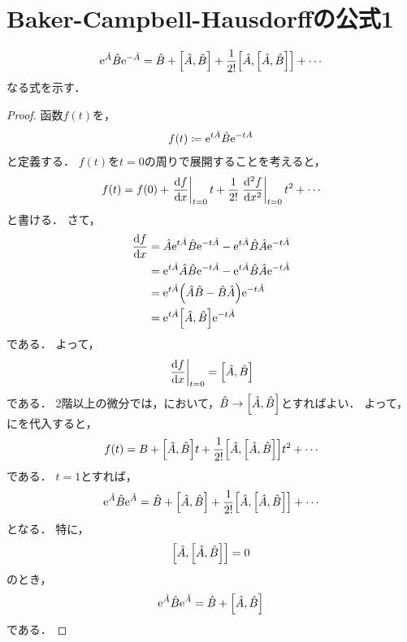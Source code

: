\documentclass{report}
\begin{document}
  \section{Baker-Campbell-Hausdorffの公式1}
    \begin{align}
      \mathrm{e}^{\hat{A}}\hat{B}\mathrm{e}^{-\hat{A}} = \hat{B} + \qty[\hat{A}, \hat{B}] + \frac{1}{2!}\qty[\hat{A}, \qty[\hat{A}, \hat{B}]] + \cdots
    \end{align}
    なる式を示す．
    \begin{proof}
      函数$f(t)$を，
      \begin{align}
        f(t) \coloneqq \mathrm{e}^{t\hat{A}}\hat{B}\mathrm{e}^{-t\hat{A}}
      \end{align}
      と定義する．
      $f(t)$を$t = 0$の周りで展開することを考えると，
      \begin{align}
        f(t) = f(0) + \eval{\dv{f}{x}}_{t = 0}t + \frac{1}{2!}\eval{\dv[2]{f}{x}}_{t = 0} t^2 + \cdots\label{taylor-bch}
      \end{align}
      と書ける．
      さて，
      \begin{align}
        \dv{f}{x} &= \hat{A}\mathrm{e}^{t\hat{A}}\hat{B}\mathrm{e}^{-t\hat{A}} - \mathrm{e}^{t\hat{A}}\hat{B}\hat{A}\mathrm{e}^{-t\hat{A}} \\ 
        &= \mathrm{e}^{t\hat{A}}\hat{A}\hat{B}\mathrm{e}^{-t\hat{A}} - \mathrm{e}^{t\hat{A}}\hat{B}\hat{A}\mathrm{e}^{-t\hat{A}} \\ 
        &= \mathrm{e}^{t\hat{A}}\qty(\hat{A}\hat{B} - \hat{B}\hat{A})\mathrm{e}^{-t\hat{A}} \\ 
        &= \mathrm{e}^{t\hat{A}}\qty[\hat{A}, \hat{B}]\mathrm{e}^{-t\hat{A}}\label{1st-diff-bch}
      \end{align}
      である．
      よって，
      \begin{align}
        \eval{\dv{f}{x}}_{t = 0} = \qty[\hat{A}, \hat{B}]
      \end{align}
      である．
      2階以上の微分では，において，$\hat{B} \to \qty[\hat{A}, \hat{B}]$とすればよい．
      よって，にを代入すると，
      \begin{align}
        f(t) = B + \qty[\hat{A}, \hat{B}]t + \frac{1}{2!}\qty[\hat{A}, \qty[\hat{A}, \hat{B}]]t^2 + \cdots
      \end{align}
      である．
      $t = 1$とすれば，
      \begin{align}
        \mathrm{e}^{\hat{A}}\hat{B}\mathrm{e}^{\hat{A}} = \hat{B} + \qty[\hat{A}, \hat{B}] + \frac{1}{2!}\qty[\hat{A}, \qty[\hat{A}, \hat{B}]] + \cdots
      \end{align}
      となる．
      特に，
      \begin{align}
        \qty[\hat{A}, \qty[\hat{A}, \hat{B}]] = 0
      \end{align}
      のとき，
      \begin{align}
        \mathrm{e}^{\hat{A}}\hat{B}\mathrm{e}^{\hat{A}} = \hat{B} + \qty[\hat{A}, \hat{B}]
      \end{align}
      である．
    \end{proof}
\end{document}
